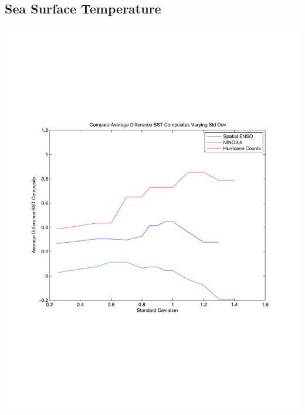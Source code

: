 \documentclass[11pt]{article}
\begin{document}
\subsection{Sea Surface Temperature}
\includegraphics[scale = 0.6]{images/varyingStdDevForCompositesSST.pdf}
\end{document}
